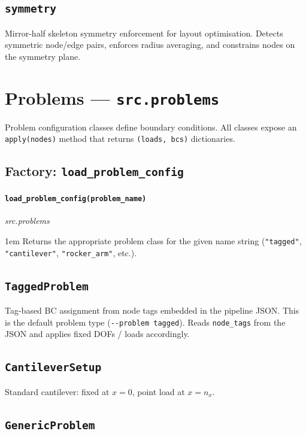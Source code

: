 \documentclass[a4paper, 11pt, openany]{report}
\newcommand{\apifunc}[2]{%
    \paragraph{\texttt{#2}}\hfill\textit{\small #1}\par\nopagebreak
}
\begin{document}
\subsection{\texttt{symmetry}}

Mirror-half skeleton symmetry enforcement for layout optimisation.  Detects
symmetric node/edge pairs, enforces radius averaging, and constrains nodes on
the symmetry plane.


\section{Problems --- \texttt{src.problems}}
\label{sec:api-problems}

Problem configuration classes define boundary conditions.  All classes expose
an \texttt{apply(nodes)} method that returns \texttt{(loads, bcs)} dictionaries.

\subsection{Factory: \texttt{load\_problem\_config}}

\apifunc{src.problems}{load\_problem\_config(problem\_name)}
\begin{adjustwidth}{1em}{}
Returns the appropriate problem class for the given name string
(\texttt{"tagged"}, \texttt{"cantilever"}, \texttt{"rocker\_arm"}, etc.).
\end{adjustwidth}


\subsection{\texttt{TaggedProblem}}

Tag-based BC assignment from node tags embedded in the pipeline JSON.  This is
the default problem type (\texttt{-{}-problem tagged}).  Reads
\texttt{node\_tags} from the JSON and applies fixed DOFs / loads accordingly.


\subsection{\texttt{CantileverSetup}}

Standard cantilever: fixed at $x = 0$, point load at $x = n_x$.


\subsection{\texttt{GenericProblem}}
\end{document}
